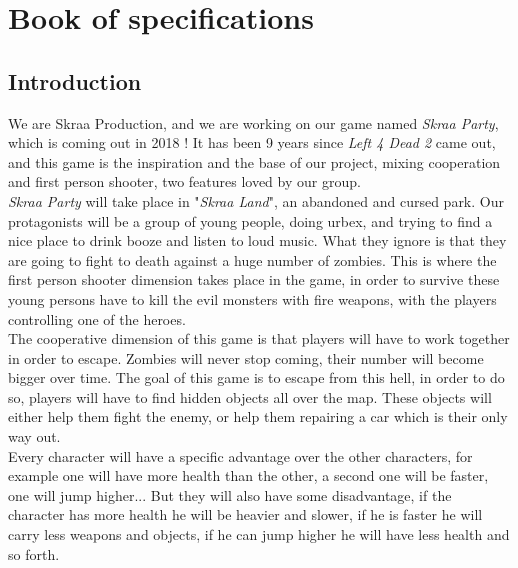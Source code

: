 \documentclass[12pt]{article}
\begin{document}

\newpage

\section{Book of specifications}

\subsection{Introduction}

   We are Skraa Production, and we are working on our game named \textit{Skraa Party}, which is coming out in 2018 ! It has been 9 years since \textit{Left 4 Dead 2} came out, and this game is the inspiration and the base of our project, mixing cooperation and first person shooter, two features loved by our group.\\


\textit{Skraa Party} will take place in "\textit{Skraa Land}", an abandoned and cursed park. Our protagonists will be a group of young people, doing urbex, and trying to find a nice place to drink booze and listen to loud music. What they ignore is that they are going to fight to death against a huge number of zombies. This is where the first person shooter dimension takes place in the game, in order to survive these young persons have to kill the evil monsters with fire weapons, with the players controlling one of the heroes.\\

The cooperative dimension of this game is that players will have to work together in order to escape. Zombies will never stop coming, their number will become bigger over time. The goal of this game is to escape from this hell, in order to do so, players will have to find hidden objects all over the map. These objects will either help them fight the enemy, or help them repairing a car which is their only way out.\\


Every character will have a specific advantage over the other characters, for example one will have more health than the other, a second one will be faster, one will jump higher... But they will also have some disadvantage, if the character has more health he will be heavier and slower, if he is faster he will carry less weapons and objects, if he can jump higher he will have less health and so forth.\\
\end{document}
